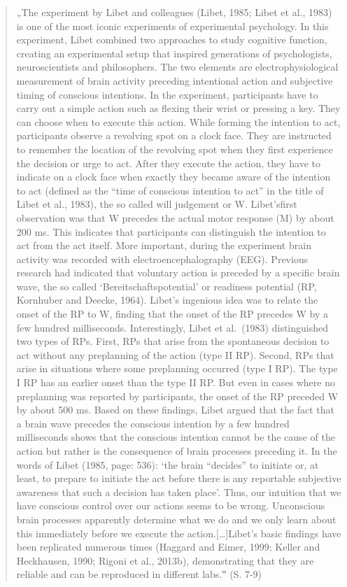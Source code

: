 \documentclass[
  a4paper,
]{report}
\begin{document}
\begin{quote}
„The experiment by Libet and colleagues (Libet, 1985; Libet et al., 1983) is one of the most iconic experiments of experimental psychology. In this experiment, Libet combined two approaches to study cognitive function, creating an experimental setup that inspired generations of psychologists, neuroscientists and philosophers. The two elements are electrophysiological measurement of brain activity preceding intentional action and subjective timing of conscious intentions. In the experiment, participants have to carry out a simple action such as flexing their wrist or pressing a key. They can choose when to execute this action. While forming the intention to act, participants observe a revolving spot on a clock face. They are instructed to remember the location of the revolving spot when they first experience the decision or urge to act. After they execute the action, they have to indicate on a clock face when exactly they became aware of the intention to act (defined as the ``time of conscious intention to act'' in the title of Libet et al., 1983), the so called will judgement or W. Libet'sfirst observation was that W precedes the actual motor response (M) by about 200 ms. This indicates that participants can distinguish the intention to act from the act itself. More important, during the experiment brain activity was recorded with electroencephalography (EEG). Previous research had indicated that voluntary action is preceded by a specific brain wave, the so called `Bereitschaftspotential' or readiness potential (RP, Kornhuber and Deecke, 1964). Libet's ingenious idea was to relate the onset of the RP to W, finding that the onset of the RP precedes W by a few hundred milliseconds. Interestingly, Libet et al.~(1983) distinguished two types of RPs. First, RPs that arise from the spontaneous decision to act without any preplanning of the action (type II RP). Second, RPs that arise in situations where some preplanning occurred (type I RP). The type I RP has an earlier onset than the type II RP. But even in cases where no preplanning was reported by participants, the onset of the RP preceded W by about 500 ms. Based on these findings, Libet argued that the fact that a brain wave precedes the conscious intention by a few hundred milliseconds shows that the conscious intention cannot be the cause of the action but rather is the consequence of brain processes preceding it. In the words of Libet (1985, page: 536): `the brain ``decides'' to initiate or, at least, to prepare to initiate the act before there is any reportable subjective awareness that such a decision has taken place'. Thus, our intuition that we have conscious control over our actions seems to be wrong. Unconscious brain processes apparently determine what we do and we only learn about this immediately before we execute the action.{[}\ldots{]}Libet's basic findings have been replicated numerous times (Haggard and Eimer, 1999; Keller and Heckhausen, 1990; Rigoni et al., 2013b), demonstrating that they are reliable and can be reproduced in different labs.‟ (S. 7-9)
\end{quote}
\end{document}

